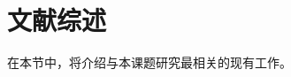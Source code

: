



\section{文献综述}
\begin{mdframed}[everyline=true]
在本节中，将介绍与本课题研究最相关的现有工作。
\\[20cm]
\end{mdframed}



